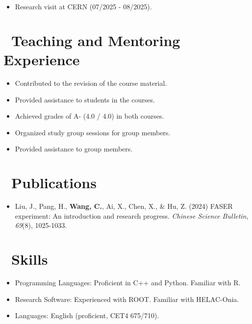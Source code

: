 \documentclass{resume}
\begin{document}
\begin {itemize}
  \item Research visit at CERN (07/2025 - 08/2025).
\end{itemize}


\section{\faUsers\ Teaching and Mentoring Experience}
\begin {itemize}
  \item Contributed to the revision of the course material.
  \item Provided assistance to students in the courses.
  \item Achieved grades of A- (4.0 / 4.0) in both courses.
\end{itemize}
\begin {itemize}
  \item Organized study group sessions for group members.
  \item Provided assistance to group members.
\end{itemize}


\section{\faFileText\ Publications}
\begin{itemize}
  \item Liu, J., Pang, H., \textbf{Wang, C.}, Ai, X., Chen, X., \& Hu, Z. (2024) FASER experiment: An introduction and research progress. \textit{Chinese Science Bulletin, 69}(8), 1025-1033.
\end{itemize}


\section{\faCogs\ Skills}
\begin{itemize}[parsep=0.5ex]
  \item Programming Languages: Proficient in C++ and Python. Familiar with R.
  \item Research Software: Experienced with ROOT. Familiar with HELAC-Onia.
  \item Languages: English (proficient, CET4 675/710).
\end{itemize}


%
%
\end{document}
